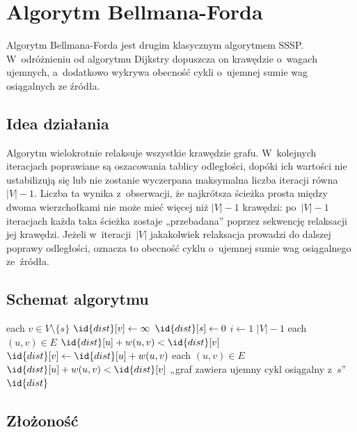 \clearpage

\section{Algorytm Bellmana-Forda}
\label{sec:sssp:bf}

Algorytm Bellmana-Forda \cite{bellman1958} jest drugim klasycznym
algorytmem SSSP. W~odróżnieniu od algorytmu Dijkstry dopuszcza on
krawędzie o~wagach ujemnych, a~dodatkowo wykrywa obecność cykli
o~ujemnej sumie wag osiągalnych ze źródła.

\subsection{Idea działania}

Algorytm wielokrotnie relaksuje wszystkie krawędzie grafu. W~kolejnych
iteracjach poprawiane są oszacowania tablicy odległości, dopóki ich
wartości nie ustabilizują się lub nie zostanie wyczerpana maksymalna
liczba iteracji równa $|V|-1$. Liczba ta wynika z~obserwacji, że
najkrótsza ścieżka prosta między dwoma wierzchołkami nie może mieć
więcej niż $|V|-1$ krawędzi: po~$|V|-1$ iteracjach każda taka ścieżka
zostaje „przebadana” poprzez sekwencję relaksacji jej krawędzi. Jeżeli
w~iteracji~$|V|$ jakakolwiek relaksacja prowadzi do dalszej poprawy
odległości, oznacza to obecność cyklu o~ujemnej sumie wag osiągalnego
ze~źródła.

\subsection{Schemat algorytmu}

\begin{codebox}
\li \For each $v \in V \setminus \{s\}$
\li \Do $\id{dist}[v] \gets \infty$
    \End
\li $\id{dist}[s] \gets 0$
\li \For $i \gets 1$ \To $|V|-1$
\li \Do \For each $(u, v) \in E$
\li     \Do \If $\id{dist}[u] + w(u, v) < \id{dist}[v]$
\li         \Then $\id{dist}[v] \gets \id{dist}[u] + w(u, v)$
            \End
        \End
    \End
\li \For each $(u, v) \in E$
\li \Do \If $\id{dist}[u] + w(u, v) < \id{dist}[v]$
\li     \Then \Return „graf zawiera ujemny cykl osiągalny z~$s$”
        \End
    \End
\li \Return $\id{dist}$
\end{codebox}

\subsection{Złożoność}

